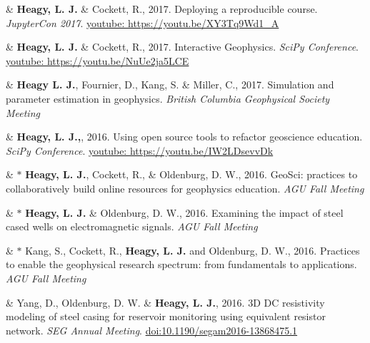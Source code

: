 \documentclass[a4paper, 11pt]{article}
\newcommand{\doi}[1]{\href{https://doi.org/#1}{doi:#1}}
\newcommand{\youtube}[1]{\href{https://youtu.be/XY3Tq9Wd1\_A}{youtube: #1}}
\begin{document}
\begin{entryright}
& \textbf{Heagy, L. J.} \& Cockett, R., 2017. Deploying a reproducible course. \emph{JupyterCon 2017}. \youtube{https://youtu.be/XY3Tq9Wd1\_A}
\end{entryright}

\begin{entryright}
& \textbf{Heagy, L. J.} \& Cockett, R., 2017. Interactive Geophysics. \emph{SciPy Conference}. \youtube{https://youtu.be/NuUe2ja5LCE}
\end{entryright}

\begin{entryright}
& \textbf{Heagy L. J.}, Fournier, D., Kang, S. \& Miller, C., 2017. Simulation and parameter estimation in geophysics. \emph{British Columbia Geophysical Society Meeting}
\end{entryright}

\begin{entryright}
& \textbf{Heagy, L. J.,}, 2016. Using open source tools to refactor geoscience education. \emph{SciPy Conference}. \youtube{https://youtu.be/IW2LDsevvDk}
\end{entryright}

\begin{entryright}
& $*$ \textbf{Heagy, L. J.}, Cockett, R., \& Oldenburg, D. W., 2016. GeoSci: practices to collaboratively build online resources for geophysics education. \emph{AGU Fall Meeting}
\end{entryright}

\begin{entryright}
& $*$ \textbf{Heagy, L. J.} \& Oldenburg, D. W., 2016. Examining the impact of steel cased wells on electromagnetic signals. \emph{AGU Fall Meeting}
\end{entryright}

\begin{entryright}
& $*$ Kang, S., Cockett, R., \textbf{Heagy, L. J.} and Oldenburg, D. W., 2016. Practices to enable the geophysical research spectrum: from fundamentals to applications. \emph{AGU Fall Meeting}
\end{entryright}

\begin{entryright}
& Yang, D., Oldenburg, D. W. \& \textbf{Heagy, L. J.}, 2016. 3D DC resistivity modeling of steel casing for reservoir monitoring using equivalent resistor network. \emph{SEG Annual Meeting}. \doi{10.1190/segam2016-13868475.1}
\end{entryright}
\end{document}
